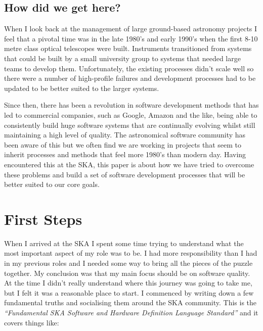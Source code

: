 \documentclass[11pt,twoside]{article}
\begin{document}
\subsection{How did we get here?} %
\label{sub:how_did_we_get_here}
When I look back at the management of large ground-based astronomy projects I feel 
that a pivotal time was in the late 1980's and early 1990's when the first 8-10 metre 
class optical telescopes were built. Instruments transitioned from systems that could be 
built by a small university group to systems that needed large teams to develop them. 
Unfortunately, the existing processes didn't scale well so there were a number of high-profile 
failures and development processes had to be updated to be better suited to the 
larger systems. 


Since then, there has been a revolution in software development methods that has 
led to commercial companies, such as Google, Amazon and the like, being able to consistently
build huge software systems that are continually evolving whilst still maintaining 
a high level of quality. The astronomical software community has been aware 
of this but we often find we are working in projects that seem to inherit processes and 
methods that feel more 1980's than modern day. Having encountered this at the SKA, 
this paper is about how we have tried to overcome these problems and build a set of 
software development processes that will be better suited to our core goals. 



\section{First Steps} %
\label{sec:first_steps}
When I arrived at the SKA I spent some time trying to understand what the most important 
aspect of my role was to be. I had more responsibility than I had in my previous 
roles and I needed some way to bring all the pieces of the puzzle together. My conclusion was 
that my main focus should be on software quality. At the time I didn't really 
understand where this journey was going to take me, but I felt it was a reasonable place 
to start. I commenced by writing down a few fundamental truths and socialising them 
around the SKA community. This is the \emph{``Fundamental SKA Software and Hardware 
Definition Language Standard''} and it covers things like: 
\end{document}
